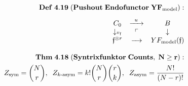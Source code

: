 \documentclass[preview]{standalone}
\begin{document}
\begin{align*}
\special{dvisvgm:raw <g id='unique000'>}\mathbf{Def\;4.19\;(Pushout\;Endofunctor\;YF_{\text{model}}):}\\[5pt]\begin{matrix} C_0 & \xrightarrow{\;\;u\;\;} & B \\ \downarrow\scriptstyle v_{\mathfrak{f}} & \ulcorner & \downarrow \\ \mathfrak{f}^{\otimes r} & \xrightarrow{\;\;\;\;} & YF_{\text{model}}(\mathfrak{f}) \end{matrix}\\[8pt]\mathbf{Thm\;4.18\;(Syntrixfunktor\;Counts,\;N\ge r):}\\Z_{\text{sym}}=\binom{N}{r},\;\; Z_{k\text{-asym}}=k!\binom{N}{r}\binom{r}{k},\;\; Z_{\text{asym}}=\frac{N!}{(N-r)!}\special{dvisvgm:raw </g>}
\end{align*}
\end{document}
